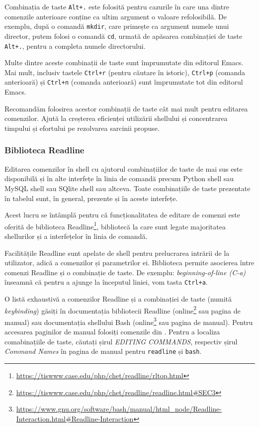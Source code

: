 Combinația de taste \texttt{Alt+.} este folosită pentru cazurile în care una dintre comenzile anterioare conține ca ultim argument o valoare refolosibilă. De exemplu, după o comandă \texttt{mkdir}, care primește ca argument numele unui director, putem folosi o comandă \texttt{cd}, urmată de apăsarea combinației de taste \texttt{Alt+.}, pentru a completa numele directorului.

Multe dintre aceste combinații de taste sunt împrumutate din editorul Emacs. Mai mult,
inclusiv tastele \texttt{Ctrl+r} (pentru căutare în istoric), \texttt{Ctrl+p} (comanda anterioară)
și \texttt{Ctrl+n} (comanda anterioară) sunt împrumutate tot din editorul Emacs.

Recomandăm folosirea acestor combinații de taste cât mai mult pentru editarea
comenzilor. Ajută la creșterea eficienței utilizării shellului și concentrarea
timpului și efortului pe rezolvarea sarcinii propuse.

\subsubsection{Biblioteca Readline}
\label{sec:cli:shell:features:readline}

Editarea comenzilor în shell cu ajutorul combinațiilor de taste de mai sus este
disponibilă și în alte interfețe în linia de comandă precum Python shell sau
MySQL shell sau SQlite shell sau altceva. Toate combinațiile de taste prezentate în tabelul  sunt, în general, prezente și în
aceste interfețe.

Acest lucru se întâmplă pentru că funcționalitatea de editare de comenzi este
oferită de biblioteca Readline\footnote{\url{https://tiswww.case.edu/php/chet/readline/rltop.html}}, bibliotecă la care sunt legate majoritatea
shellurilor și a interfețelor în linia de comandă.

Facilitățile Readline sunt apelate de shell pentru prelucrarea intrării de la
utilizator, adică a comenzilor și parametrilor ei. Biblioteca permite asocierea
între comenzi Readline și o combinație de taste. De exemplu: \textit{beginning-of-line
(C-a)} înseamnă că pentru a ajunge la începutul liniei, vom tasta \texttt{Ctrl+a}.

O listă exhaustivă a comenzilor Readline și a combinației de taste (numită
\textit{keybinding}) găsiți în documentația bibliotecii Readline (online\footnote{\url{https://tiswww.case.edu/php/chet/readline/readline.html\#SEC3}} sau pagina de
manual) sau documentația shellului Bash (online\footnote{\url{https://www.gnu.org/software/bash/manual/html\_node/Readline-Interaction.html\#Readline-Interaction}} sau pagina de manual). Pentru accesarea
paginilor de manual folosiți comenzile din . Pentru a localiza comabinațiile de taste, căutați șirul \textit{EDITING COMMANDS}, respectiv șirul \textit{Command Names} în pagina de manual pentru \texttt{readline} și \texttt{bash}.

